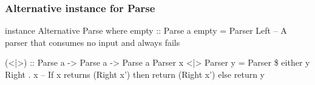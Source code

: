 \documentclass{beamer}
\begin{document}
\begin{frame}
\frametitle{Alternative instance for Parse}
instance Alternative Parse where
  empty :: Parse a
  empty = Parser Left
  -- A parser that consumes no input and always fails

  (<|>) :: Parse a -> Parse a -> Parse a
  Parser x <|> Parser y = Parser \$ either y Right . x
  -- If x returns (Right x') then return (Right x') else return y

%


%
%
\end{frame}
\end{document}

